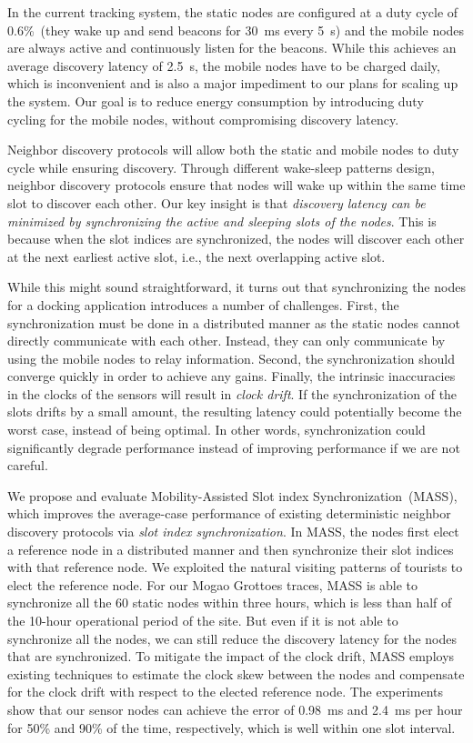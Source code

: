 \documentclass[twoside,twocolumn]{article}
\begin{document}
In the current tracking system, the static nodes are configured at a duty cycle of 0.6\%~(they wake up and send beacons
for 30~ms every 5~s) and the mobile nodes are always active and continuously listen for the beacons. While this achieves
an average discovery latency of 2.5~s, the mobile nodes have to be charged daily, which is inconvenient and is also a
major impediment to our plans for scaling up the system. Our goal is to reduce energy consumption by introducing duty
cycling for the mobile nodes, without compromising discovery latency.

Neighbor discovery protocols will allow both the static and mobile nodes to duty cycle while ensuring discovery. Through
different wake-sleep patterns design, neighbor discovery protocols ensure that nodes will wake up within the same time
slot to discover each other. Our key insight is that \emph{discovery latency can be minimized by synchronizing the active 
and sleeping slots of the nodes}. This is because when the slot indices are synchronized, the nodes will discover each 
other at the next earliest active slot, i.e., the next overlapping active slot.

While this might sound straightforward, it turns out that synchronizing the nodes for a docking application introduces
a number of challenges. First, the synchronization must be done in a distributed manner as the static nodes cannot 
directly communicate with each other. Instead, they can only communicate by using the mobile nodes to relay information.
Second, the synchronization should converge quickly in order to achieve any gains. Finally, the intrinsic inaccuracies
in the clocks of the sensors will result in \emph{clock drift}. If the synchronization of the slots drifts by a small
amount, the resulting latency could potentially become the worst case, instead of being optimal. In other words, 
synchronization could significantly degrade performance instead of improving performance if we are not careful.

We propose and evaluate Mobility-Assisted Slot index Synchronization~(MASS), which improves the average-case performance
of existing deterministic neighbor discovery protocols via \emph{slot index synchronization}. In MASS, the nodes first
elect a reference node in a distributed manner and then synchronize their slot indices with that reference node. We
exploited the natural visiting patterns of tourists to elect the reference node. For our Mogao Grottoes traces, MASS is
able to synchronize all the 60 static nodes within three hours, which is less than half of the 10-hour operational period
of the site. But even if it is not able to synchronize all the nodes, we can still reduce the discovery latency for the
nodes that are synchronized. To mitigate the impact of the clock drift, MASS employs existing techniques to estimate the 
clock skew between the nodes and compensate for the clock drift with respect to the elected reference node. The experiments
show that our sensor nodes can achieve the error of 0.98~ms and 2.4~ms per hour for 50\% and 90\% of the time, respectively,
which is well within one slot interval.
\end{document}

